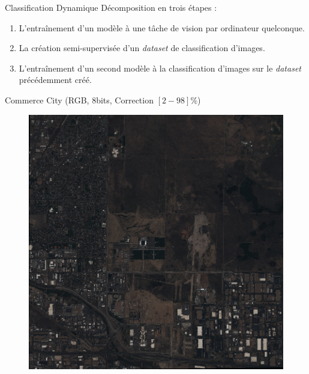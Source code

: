 \documentclass[11pt]{beamer}
\begin{document}
\begin{frame}{Classification Dynamique}
	Décomposition en trois étapes :
	\begin{enumerate}
		\item L'entraînement d'un modèle à une tâche de vision par ordinateur quelconque.
		\item La création semi-supervisée d'un \emph{dataset} de classification d'images.
		\item L'entraînement d'un second modèle à la classification d'images sur le \emph{dataset} précédemment créé.
	\end{enumerate}
\end{frame}

\begin{frame}{Commerce City (RGB, 8bits, Correction $[2-98]\%$)}
	\begin{figure}[H]
		\centering
		\includegraphics[scale=0.35]{Images/CommerceCity.png}
	\end{figure}
\end{frame}
\end{document}
